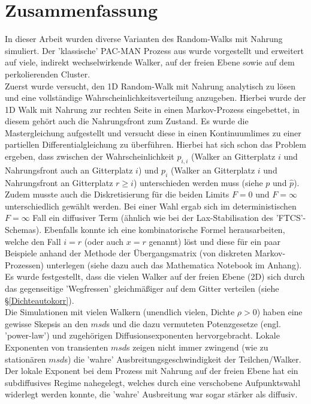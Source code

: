 \documentclass[a4paper, 12pt]{report}
\begin{document}
\section{Zusammenfassung}
In dieser Arbeit wurden diverse Varianten des Random-Walks mit Nahrung simuliert. Der 'klassische' PAC-MAN Prozess aus \cite{doi:10.1063/1.4999485} wurde vorgestellt und erweitert auf viele, indirekt wechselwirkende Walker, auf der freien Ebene sowie auf dem perkolierenden Cluster.
\\
Zuerst wurde versucht, den 1D Random-Walk mit Nahrung analytisch zu lösen und eine vollständige Wahrscheinlichkeitsverteilung anzugeben. Hierbei wurde der 1D Walk mit Nahrung zur rechten Seite in einen Markov-Prozess eingebettet, in diesem gehört auch die Nahrungsfront zum Zustand. Es wurde die Mastergleichung aufgestellt und versucht diese in einen Kontinuumlimes zu einer partiellen Differentialgleichung zu überführen. Hierbei hat sich schon das Problem ergeben, dass zwischen der Wahrscheinlichkeit $p_{i,i}$ (Walker an Gitterplatz $i$ und Nahrungsfront auch an Gitterplatz $i$) und $p_i$ (Walker an Gitterplatz $i$ und Nahrungsfront an Gitterplatz $r \geq i$) unterschieden werden muss (siehe $p$ und $\hat{p}$). Zudem musste auch die Diskretisierung für die beiden Limits $F=0$ und $F=\infty$ unterschiedlich gewählt werden. Bei einer Wahl ergab sich im deterministischen $F=\infty$ Fall ein diffusiver Term (ähnlich wie bei der Lax-Stabilisation des 'FTCS'-Schemas). Ebenfalls konnte ich eine kombinatorische Formel herausarbeiten, welche den Fall $i=r$ (oder auch $x=r$ genannt) löst und diese für ein paar Beispiele anhand der Methode der Übergangsmatrix (von diskreten Markov-Prozessen) unterlegen (siehe dazu auch das Mathematica Notebook im Anhang).
\\
Es wurde festgestellt, dass die vielen Walker auf der freien Ebene (2D) sich durch das gegenseitige 'Wegfressen' gleichmäßiger auf dem Gitter verteilen (siehe §\ref{Dichteautokorr}).
\\
Die Simulationen mit vielen Walkern (unendlich vielen, Dichte $\rho > 0$) haben eine gewisse Skepsis an den $msd$s und die dazu vermuteten Potenzgesetze (engl. 'power-law') und zugehörigen Diffusionsexponenten hervorgebracht. Lokale Exponenten von transienten $msd$s zeigen nicht immer zwingend (wie zu stationären $msd$s) die 'wahre' Ausbreitungsgeschwindigkeit der Teilchen/Walker. Der lokale Exponent bei dem Prozess mit Nahrung auf der freien Ebene hat ein subdiffusives Regime nahegelegt, welches durch eine verschobene Aufpunktswahl widerlegt werden konnte, die 'wahre' Ausbreitung war sogar stärker als diffusiv.
\end{document}
